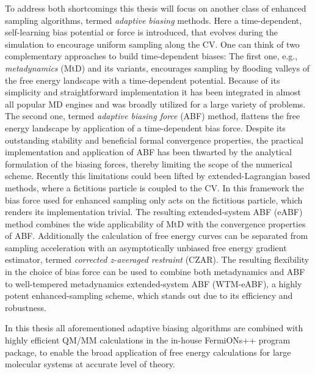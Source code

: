 To address both shortcomings this thesis will focus on another class of enhanced sampling algorithms, termed \textit{adaptive biasing} methods.\autocite{barducci2008well,comer2015adaptive,lesage2017smoothed}
Here a time-dependent, self-learning bias potential or force is introduced, that evolves during the simulation to encourage uniform sampling along the CV.
One can think of two complementary approaches to build time-dependent biases:
The first one, e.g., \textit{metadynamics} (MtD)\autocite{barducci2011metadynamics} and its variants, encourages sampling by flooding valleys of the free energy landscape with a time-dependent potential.
Because of its simplicity and straightforward implementation it has been integrated in almost all popular MD engines and was broadly utilized for a large variety of problems.\autocite{vymetal2011gyration,tanida2020alchemical,ikeda2005hydration}
The second one, termed \textit{adaptive biasing force} (ABF)\autocite{comer2015adaptive} method, flattens the free energy landscape by application of a time-dependent bias force.
Despite its outstanding stability and beneficial formal convergence properties, the practical implementation and application of ABF has been thwarted by the analytical formulation of the biasing forces, thereby limiting the scope of the numerical scheme.\autocite{fiorin2013using}
Recently this limitations could been lifted by extended-Lagrangian based methods, where a fictitious particle is coupled to the CV.
In this framework the bias force used for enhanced sampling only acts on the fictitious particle, which renders its implementation trivial.
The resulting extended-system ABF (eABF)\autocite{lesage2017smoothed} method combines the wide applicability of MtD with the convergence properties of ABF.
Additionally the calculation of free energy curves can be separated from sampling acceleration with an asymptotically unbiased free energy gradient estimator, termed \textit{corrected z-averaged restraint} (CZAR).\autocite{lesage2017smoothed}
The resulting flexibility in the choice of bias force can be used to combine both metadynamics and ABF to well-tempered metadynamics extended-system ABF (WTM-eABF),\autocite{fu2018zooming,fu2019taming} a highly potent enhanced-sampling scheme, which stands out due to its efficiency and robustness.

In this thesis all aforementioned adaptive biasing algorithms are combined with highly efficient QM/MM calculations in the in-house FermiONs++\autocite{kussmann2013linear} program package, to enable the broad application of free energy calculations for large molecular systems at accurate level of theory.
